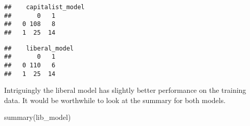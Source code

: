 \documentclass[
]{article}
\newenvironment{Shaded}{\begin{snugshade}}{\end{snugshade}}
\newcommand{\AttributeTok}[1]{\textcolor[rgb]{0.77,0.63,0.00}{#1}}
\newcommand{\DecValTok}[1]{\textcolor[rgb]{0.00,0.00,0.81}{#1}}
\newcommand{\FloatTok}[1]{\textcolor[rgb]{0.00,0.00,0.81}{#1}}
\newcommand{\FunctionTok}[1]{\textcolor[rgb]{0.00,0.00,0.00}{#1}}
\newcommand{\NormalTok}[1]{#1}
\newcommand{\OtherTok}[1]{\textcolor[rgb]{0.56,0.35,0.01}{#1}}
\newcommand{\SpecialCharTok}[1]{\textcolor[rgb]{0.00,0.00,0.00}{#1}}
\newcommand{\StringTok}[1]{\textcolor[rgb]{0.31,0.60,0.02}{#1}}
\begin{document}
\begin{Shaded}
\end{Shaded}

\begin{verbatim}
##    capitalist_model
##       0   1
##   0 108   8
##   1  25  14
\end{verbatim}

\begin{Shaded}
\end{Shaded}

\begin{verbatim}
##    liberal_model
##       0   1
##   0 110   6
##   1  25  14
\end{verbatim}

Intriguingly the liberal model has slightly better performance on the
training data. It would be worthwhile to look at the summary for both
models.

\begin{Shaded}
\begin{Highlighting}[]
\FunctionTok{summary}\NormalTok{(lib\_model)}
\end{Highlighting}
\end{Shaded}
\end{document}

